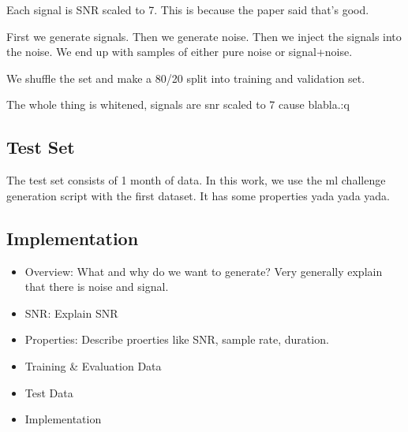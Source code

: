 Each signal is SNR scaled to 7. This is because the paper said that's good.


First we generate signals. Then we generate noise. Then we inject the signals
into the noise. We end up with samples of either pure noise or signal+noise.

We shuffle the set and make a 80/20 split into training and validation set.

The whole thing is whitened, signals are snr scaled to 7 cause blabla.:q


\subsection{Test Set}
The test set consists of 1 month of data. In this work, we use the ml challenge
generation script with the first dataset. It has some properties yada yada yada.

\subsection{Implementation}

\begin{itemize}
  \item Overview: What and why do we want to generate? Very generally explain
        that there is noise and signal.
  \item SNR: Explain SNR
  \item Properties: Describe proerties like SNR, sample rate, duration.
  \item Training \& Evaluation Data
  \item Test Data
  \item Implementation
\end{itemize}
